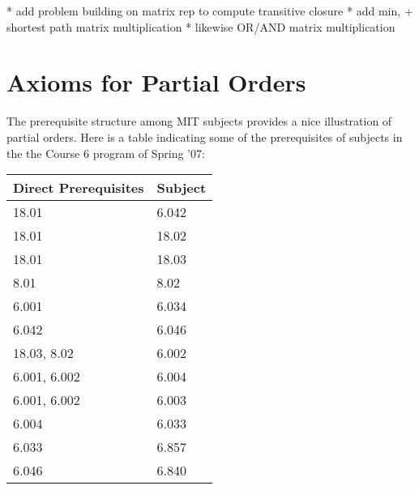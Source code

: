 \begin{problems}
\practiceproblems
{}

\classproblems
{}

\homeworkproblems
{}

\examproblems
{}

\end{problems}

\begin{editingnotes}
* add problem building on matrix rep to compute transitive closure
* add min, + shortest path matrix  multiplication
* likewise OR/AND matrix multiplication
\end{editingnotes}



\iffalse
\subsection{Weak Partial Orders}\label{partial_order_sec}

, but so is the containment relation on sets
and the divisibility relation on integers.
\fi

\iffalse

\section{Axioms for Partial Orders}

The prerequisite structure among MIT subjects provides a nice illustration
of partial orders.  Here is a table indicating some of the prerequisites of
subjects in the the Course 6 program of Spring '07:
\begin{center}
\begin{tabular}{|l|l|}
\hline
Direct Prerequisites & Subject\\ \hline
18.01 & 6.042\\ \hline
 18.01 & 18.02\\ \hline
 18.01 & 18.03\\ \hline
 8.01 & 8.02\\ \hline
 6.001 & 6.034\\ \hline
 6.042 & 6.046\\ \hline
 18.03, 8.02 & 6.002\\ \hline
 6.001, 6.002 & 6.004\\ \hline
 6.001, 6.002 & 6.003\\ \hline
 6.004 & 6.033\\ \hline
 6.033 & 6.857\\ \hline
 6.046 & 6.840\\ \hline
\end{tabular}
\end{center}

